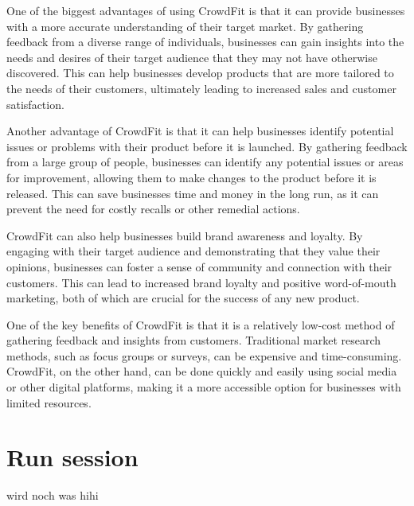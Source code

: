 One of the biggest advantages of using CrowdFit is that it can provide businesses with a more accurate understanding of their 
target market. By gathering feedback from a diverse range of individuals, businesses can gain insights into the needs and desires 
of their target audience that they may not have otherwise discovered. This can help businesses develop products that are more 
tailored to the needs of their customers, ultimately leading to increased sales and customer satisfaction.

Another advantage of CrowdFit is that it can help businesses identify potential issues or problems with their product before it 
is launched. By gathering feedback from a large group of people, businesses can identify any potential issues or areas for improvement, 
allowing them to make changes to the product before it is released. This can save businesses time and money in the long run, as it can 
prevent the need for costly recalls or other remedial actions.

CrowdFit can also help businesses build brand awareness and loyalty. By engaging with their target audience and demonstrating that they 
value their opinions, businesses can foster a sense of community and connection with their customers. This can lead to increased brand 
loyalty and positive word-of-mouth marketing, both of which are crucial for the success of any new product.

One of the key benefits of CrowdFit is that it is a relatively low-cost method of gathering feedback and insights from customers. 
Traditional market research methods, such as focus groups or surveys, can be expensive and time-consuming. CrowdFit, on the other hand, 
can be done quickly and easily using social media or other digital platforms, making it a more accessible option for businesses with limited resources.

\section{Run session}
wird noch was hihi